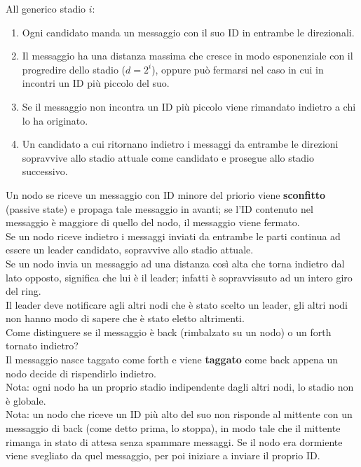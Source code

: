 All generico stadio $i$:
\begin{enumerate}
 \item Ogni candidato manda un messaggio con il suo ID in entrambe le direzionali.
 \item Il messaggio ha una distanza massima che cresce in modo esponenziale con il progredire dello stadio ($d = 2^i$), oppure può fermarsi
 nel caso in cui in incontri un ID più piccolo del suo.
 \item Se il messaggio non incontra un ID più piccolo viene rimandato indietro a chi lo ha originato.
 \item Un candidato a cui ritornano indietro i messaggi da entrambe le direzioni sopravvive allo stadio attuale come candidato e prosegue
 allo stadio successivo.
\end{enumerate}

Un nodo se riceve un messaggio con ID minore del priorio viene \textbf{sconfitto} (passive state) e propaga tale messaggio in avanti;
se l'ID contenuto nel messaggio è maggiore di quello del nodo, il messaggio viene fermato.\\
Se un nodo riceve indietro i messaggi inviati da entrambe le parti continua ad essere un leader candidato, sopravvive allo stadio attuale. \\
Se un nodo invia un messaggio ad una distanza così alta che torna indietro dal lato opposto, significa che lui è il leader;
infatti è sopravvissuto ad un intero giro del ring. \\
Il leader deve notificare agli altri nodi che è stato scelto un leader, gli altri nodi non hanno modo di sapere che è stato eletto altrimenti. \\

Come distinguere se il messaggio è back (rimbalzato su un nodo) o un forth tornato indietro? \\
Il messaggio nasce taggato come forth e viene \textbf{taggato} come back appena un nodo decide di rispendirlo indietro. \\

Nota: ogni nodo ha un proprio stadio indipendente dagli altri nodi, lo stadio non è globale. \\
Nota: un nodo che riceve un ID più alto del suo non risponde al mittente con un messaggio di back (come detto prima, lo stoppa),
in modo tale che il mittente rimanga in stato di attesa senza spammare messaggi. Se il nodo era dormiente viene svegliato
da quel messaggio, per poi iniziare a inviare il proprio ID.

